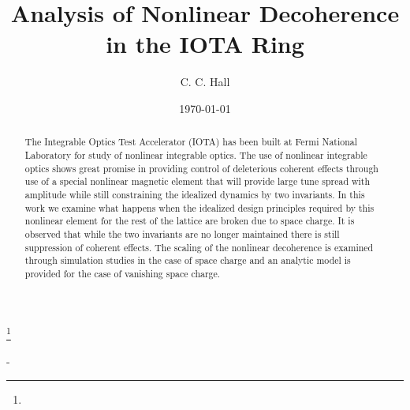 \documentclass[aps,prstab,twocolumn, groupedaddress]{revtex4-1}
\begin{document}

\title{Analysis of Nonlinear Decoherence in the IOTA Ring}


\author{C. C. Hall}
\thanks{}


\date{\today}

\begin{abstract}
The Integrable Optics Test Accelerator (IOTA) has been built at Fermi National Laboratory 
for study of nonlinear integrable optics. The use of nonlinear integrable optics shows 
great promise in providing control of deleterious coherent effects through use of a special 
nonlinear magnetic element that will provide large tune spread with amplitude while still 
constraining the idealized dynamics by two invariants. In this work we examine what 
happens when the idealized design principles required by this nonlinear element for the 
rest of the lattice are broken due to space charge. It is observed that while the two 
invariants are no longer maintained there is still suppression of coherent effects. The 
scaling of the nonlinear decoherence is examined through simulation studies in the case 
of space charge and an analytic model is provided for the case of vanishing space charge.
\end{abstract}-
\end{document}
